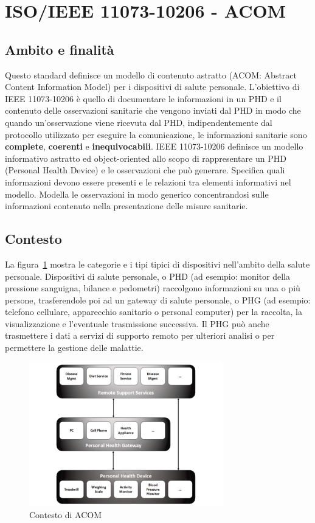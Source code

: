 \documentclass{article}
\begin{document}
\clearpage

\tableofcontents
\newpage

\section{ISO/IEEE 11073-10206 - ACOM}

\subsection{Ambito e finalità}
Questo standard definisce un modello di contenuto astratto (ACOM: Abstract Content Information Model) per i dispositivi di salute personale.
L'obiettivo di IEEE 11073-10206 è quello di documentare le informazioni in un PHD e il contenuto delle osservazioni sanitarie che vengono inviati dal
PHD in modo che quando un'osservazione viene ricevuta dal PHD, indipendentemente dal protocollo utilizzato per eseguire
la comunicazione, le informazioni sanitarie sono \textbf{complete}, \textbf{coerenti} e \textbf{inequivocabili}.
IEEE 11073-10206 definisce un modello informativo astratto ed object-oriented allo scopo di rappresentare un PHD (Personal Health Device) e le osservazioni che può generare.
Specifica quali informazioni devono essere presenti e le relazioni tra elementi informativi nel modello. Modella le osservazioni in modo generico
concentrandosi sulle informazioni contenuto nella presentazione delle misure sanitarie.

\subsection{Contesto}
La figura~\ref{fig:overallContextOfWork} mostra le categorie e i tipi tipici di dispositivi nell'ambito della salute personale. Dispositivi di salute personale, o PHD
(ad esempio: monitor della pressione sanguigna, bilance e pedometri) raccolgono informazioni su una o più persone, trasferendole poi ad un gateway
di salute personale, o PHG (ad esempio: telefono cellulare, apparecchio sanitario o personal computer) per la raccolta, la visualizzazione
e l'eventuale trasmissione successiva. Il PHG può anche trasmettere i dati a servizi di supporto remoto per ulteriori analisi o per permettere la gestione delle malattie.

\begin{figure}[H]
    \centering
    \includegraphics[width=0.75\textwidth]{figures/overall context of work.png}
    \caption{Contesto di ACOM}
    \label{fig:overallContextOfWork}
\end{figure}
\end{document}

